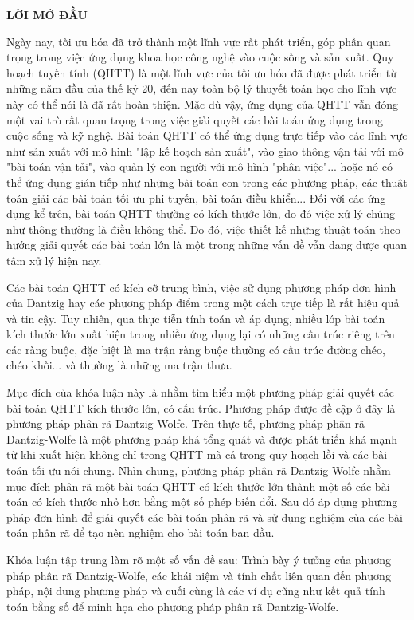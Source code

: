 
\centerline{\bf \large\MakeUppercase{Lời mở đầu}}
\vspace{20pt}
Ngày nay, tối ưu hóa đã trở thành một lĩnh vực rất phát triển, góp phần quan trọng trong việc ứng dụng khoa học công nghệ vào cuộc sống và sản xuất. Quy hoạch tuyến tính (QHTT) là một lĩnh vực của tối ưu hóa đã được phát triển từ những năm đầu của thế kỷ 20, đến nay toàn bộ lý thuyết toán học cho lĩnh vực này có thể nói là đã rất hoàn thiện. Mặc dù vậy, ứng dụng của QHTT vẫn đóng một vai trò rất quan trọng trong việc giải quyết các bài toán ứng dụng trong cuộc sống và kỹ nghệ. Bài toán QHTT có thể ứng dụng trực tiếp vào các lĩnh vực như sản xuất với mô hình "lập kế hoạch sản xuất", vào giao thông vận tải với mô "bài toán vận tải", vào quản lý con người với mô hình "phân việc"... hoặc nó có thể ứng dụng gián tiếp như những bài toán con trong các phương pháp, các thuật toán giải các bài toán tối ưu phi tuyến, bài toán điều khiển... Đối với các ứng dụng kể trên, bài toán QHTT thường có kích thước lớn, do đó việc xử lý chúng như thông thường là điều không thể. Do đó, việc thiết kế những thuật toán theo hướng giải quyết các bài toán lớn là một trong những vấn đề vẫn đang được quan tâm xử lý hiện nay.

Các bài toán QHTT có kích cỡ trung bình, việc sử dụng phương pháp đơn hình của Dantzig hay các phương pháp điểm trong một cách trực tiếp là rất hiệu quả và tin cậy. Tuy nhiên, qua thực tiễn tính toán và áp dụng, nhiều lớp bài toán kích thước lớn xuất hiện trong nhiều ứng dụng lại có những cấu trúc riêng trên các ràng buộc, đặc biệt là ma trận ràng buộc thường có cấu trúc đường chéo, chéo khối... và thường là những ma trận thưa.

Mục đích của khóa luận này là nhằm tìm hiểu một phương pháp giải quyết các bài toán QHTT kích thước lớn, có cấu trúc. Phương pháp được đề cập ở đây là phương pháp phân rã Dantzig-Wolfe. Trên thực tế, phương pháp phân rã Dantzig-Wolfe là một phương pháp khá tổng quát và được phát triển khá mạnh từ khi xuất hiện không chỉ trong QHTT mà cả trong quy hoạch lồi và các bài toán tối ưu nói chung. Nhìn chung, phương pháp phân rã Dantzig-Wolfe nhằm mục đích phân rã một bài toán QHTT có kích thước lớn thành một số các bài toán có kích thước nhỏ hơn bằng một số phép biến đổi. Sau đó áp dụng phương pháp đơn hình để giải quyết các bài toán phân rã và sử dụng nghiệm của các bài toán phân rã để tạo nên nghiệm cho bài toán ban đầu.

Khóa luận tập trung làm rõ một số vấn đề sau: Trình bày ý tưởng của phương pháp phân rã Dantzig-Wolfe, các khái niệm và tính chất liên quan đến phương pháp, nội dung phương pháp và cuối cùng là các ví dụ cũng như kết quả tính toán bằng số để minh họa cho phương pháp phân rã Dantzig-Wolfe.


